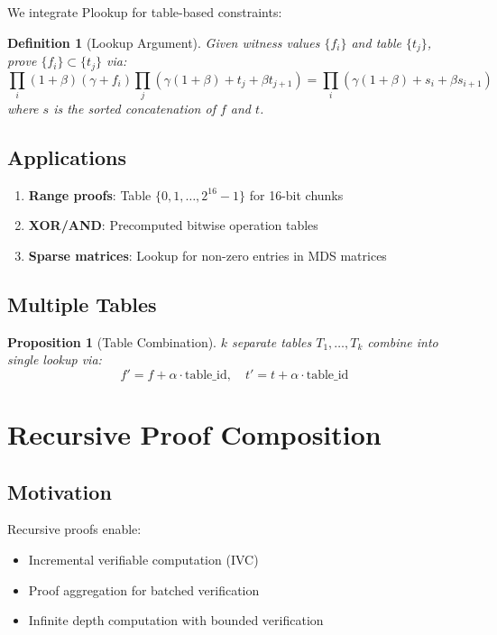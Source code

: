 \documentclass[11pt,a4paper]{article}
\newtheorem{definition}[theorem]{Definition}
\newtheorem{proposition}[theorem]{Proposition}
\begin{document}
We integrate Plookup \cite{plookup} for table-based constraints:

\begin{definition}[Lookup Argument]
Given witness values $\{f_i\}$ and table $\{t_j\}$, prove $\{f_i\} \subset \{t_j\}$ via:
\[
\prod_i (1 + \beta)(\gamma + f_i) \prod_j (\gamma(1+\beta) + t_j + \beta t_{j+1}) = \prod_i (\gamma(1+\beta) + s_i + \beta s_{i+1})
\]
where $s$ is the sorted concatenation of $f$ and $t$.
\end{definition}

\subsection{Applications}

\begin{enumerate}[label=(\roman*)]
    \item \textbf{Range proofs}: Table $\{0, 1, \ldots, 2^{16}-1\}$ for 16-bit chunks
    \item \textbf{XOR/AND}: Precomputed bitwise operation tables
    \item \textbf{Sparse matrices}: Lookup for non-zero entries in MDS matrices
\end{enumerate}

\subsection{Multiple Tables}

\begin{proposition}[Table Combination]
$k$ separate tables $T_1, \ldots, T_k$ combine into single lookup via:
\[
f' = f + \alpha \cdot \text{table\_id}, \quad t' = t + \alpha \cdot \text{table\_id}
\]
\end{proposition}

\section{Recursive Proof Composition}
\label{sec:recursion}

\subsection{Motivation}

Recursive proofs enable:
\begin{itemize}
    \item Incremental verifiable computation (IVC)
    \item Proof aggregation for batched verification
    \item Infinite depth computation with bounded verification
\end{itemize}
\end{document}
